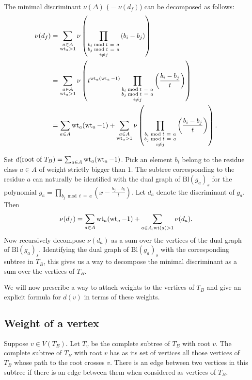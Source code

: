 The minimal discriminant $\nu(\Delta)$ ($=\nu(d_f)$) can be decomposed as follows: 
\begin{align*} 
\nu(d_f) &= \sum_{\substack{a \in A \\ \wt_a > 1}} \nu \left(\prod_{\substack{b_i  \bmod t \ = \ a \\ b_j \bmod t \ = \ a \\ i \neq j}} \left( b_i  - b_j  \right) \right)  \\
&= \sum_{\substack{a \in A \\ \wt_a > 1}} \nu \left(t^{\wt_a(\wt_a-1)}\prod_{\substack{b_i \bmod t \ = \ a \\ b_j \bmod t \ = \ a \\ i \neq j}} \left( \frac{b_i  - b_j }{t} \right) \right)  \\
&= \sum_{a \in A} \wt_a(\wt_a-1) + \sum_{\substack{a \in A \\ \wt_a > 1}} \nu \left(\prod_{\substack{b_i \bmod t \ = \ a \\ b_j \bmod t \ = \ a \\ i \neq j}} \left( \frac{b_i  - b_j }{t} \right) \right) .
\end{align*}

Set $d(\textup{root of }T_B) = \sum_{a \in A} \operatorname{wt}_a(\operatorname{wt}_a-1)$. Pick an element $b_i$ belong to the residue class $a \in A$ of weight strictly bigger than $1$. The subtree corresponding to the residue $a$ can  naturally be identified with the dual graph of $\mathrm{Bl}(g_a)_s$ for the polynomial $\displaystyle{g_a = \prod_{b_j \bmod t \ = \ a} (x- \tfrac{b_j -b_i }{t})}$. Let $d_a$ denote the discriminant of $g_a$. Then
\[ \nu(d_f) = \sum_{a \in A} \operatorname{wt}_a(\operatorname{wt}_a-1) + \sum_{a \in A, \operatorname{wt}(a)>1} \nu(d_a) .\]
Now recursively decompose $\nu(d_a)$ as a sum over the vertices of the dual graph of $\mathrm{Bl}(g_a)_s$. Identifying the dual graph of $\mathrm{Bl}(g_a)_s$ with the corresponding subtree in $T_B$, this gives us a way to decompose the minimal discriminant as a sum over the vertices of $T_B$.

We will now prescribe a way to attach weights to the vertices of $T_B$ and give an explicit formula for $d(v)$ in terms of these weights.
\subsection{Weight of a vertex}
Suppose $v \in V(T_B)$. Let $T_v$ be the complete subtree of $T_B$ with root $v$. The complete subtree of $T_B$ with root $v$ has as its set of vertices all those vertices of $T_B$ whose path to the root crosses $v$. There is an edge between two vertices in this subtree if there is an edge between them when considered as vertices of $T_B$.  

